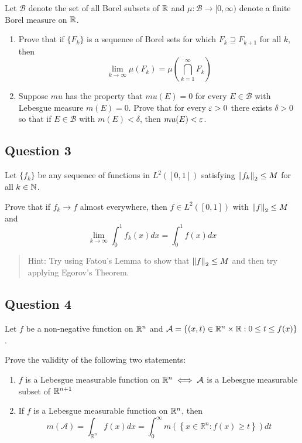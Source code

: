 \documentclass[12pt]{article}
\begin{document}
Let \(\mathcal B\) denote the set of all Borel subsets of \({\mathbb{R}}\) and
\(\mu : \mathcal B \to [0, \infty)\) denote a finite Borel measure on
\({\mathbb{R}}\).

\begin{enumerate}
\def\labelenumi{\alph{enumi}.}
\item
  Prove that if \(\{F_k\}\) is a sequence of Borel sets for which
  \(F_k \supseteq F_{k+1}\) for all \(k\), then \[
  \lim _{k \rightarrow \infty} \mu\left(F_{k}\right)=\mu\left(\bigcap_{k=1}^{\infty} F_{k}\right)
  \]
\item
  Suppose \(mu\) has the property that \(mu(E) = 0\) for every
  \(E \in \mathcal B\) with Lebesgue measure \(m(E) = 0\). Prove that
  for every \(\varepsilon > 0\) there exists \(\delta > 0\) so that if
  \(E \in \mathcal B\) with \(m(E) < \delta\), then \(mu(E) < \varepsilon\).
\end{enumerate}

\hypertarget{question-3-1}{%
\subsection{Question 3}\label{question-3-1}}

Let \(\{f_k\}\) be any sequence of functions in \(L^2([0, 1])\)
satisfying \({\left\lVert {f_k} \right\rVert}_2 \leq M\) for all \(k \in {\mathbb{N}}\).

Prove that if \(f_k \to f\) almost everywhere, then
\(f \in L^2([0, 1])\) with \({\left\lVert {f} \right\rVert}_2 \leq M\) and \[
\lim _{k \rightarrow \infty} \int_{0}^{1} f_{k}(x) dx = \int_{0}^{1} f(x) d x
\]

\begin{quote}
Hint: Try using Fatou's Lemma to show that \({\left\lVert {f} \right\rVert}_2 \leq M\) and
then try applying Egorov's Theorem.
\end{quote}

\hypertarget{question-4-1}{%
\subsection{Question 4}\label{question-4-1}}

Let \(f\) be a non-negative function on \({\mathbb{R}}^n\) and
\(\mathcal A = \{(x, t) \in {\mathbb{R}}^n \times {\mathbb{R}} : 0 \leq t \leq f (x)\}\).

Prove the validity of the following two statements:

\begin{enumerate}
\def\labelenumi{\alph{enumi}.}
\item
  \(f\) is a Lebesgue measurable function on \({\mathbb{R}}^n \iff \mathcal A\)
  is a Lebesgue measurable subset of \({\mathbb{R}}^{n+1}\)
\item
  If \(f\) is a Lebesgue measurable function on \({\mathbb{R}}^n\), then \[
  m(\mathcal{A})=\int_{\mathbb{R}^{n}} f(x) d x=\int_{0}^{\infty} m\left(\left\{x \in \mathbb{R}^{n}: f(x) \geq t\right\}\right) d t
  \]
\end{enumerate}
\end{document}
